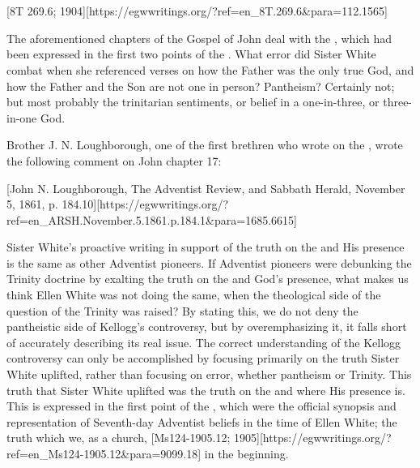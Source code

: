 \\
 \\
 \\
 \\
 \\
 \\
 \\
[8T 269.6; 1904][https://egwwritings.org/?ref=en\_8T.269.6&para=112.1565]

The aforementioned chapters of the Gospel of John deal with the , which had been expressed in the first two points of the . What error did Sister White combat when she referenced verses on how the Father was the only true God, and how the Father and the Son are not one in person? Pantheism? Certainly not; but most probably the trinitarian sentiments, or belief in a one-in-three, or three-in-one God.

Brother J. N. Loughborough, one of the first brethren who wrote on the , wrote the following comment on John chapter 17:

[John N. Loughborough, The Adventist Review, and Sabbath Herald, November 5, 1861, p. 184.10][https://egwwritings.org/?ref=en\_ARSH.November.5.1861.p.184.1&para=1685.6615]

Sister White’s proactive writing in support of the truth on the  and His presence is the same as other Adventist pioneers. If Adventist pioneers were debunking the Trinity doctrine by exalting the truth on the  and God’s presence, what makes us think Ellen White was not doing the same, when the theological side of the question of the Trinity was raised? By stating this, we do not deny the pantheistic side of Kellogg’s controversy, but by overemphasizing it, it falls short of accurately describing its real issue. The correct understanding of the Kellogg controversy can only be accomplished by focusing primarily on the truth Sister White uplifted, rather than focusing on error, whether pantheism or Trinity. This truth that Sister White uplifted was the truth on the  and where His presence is. This is expressed in the first point of the , which were the official synopsis and representation of Seventh-day Adventist beliefs in the time of Ellen White; the truth which we, as a church, [Ms124-1905.12; 1905][https://egwwritings.org/?ref=en\_Ms124-1905.12&para=9099.18] in the beginning.

